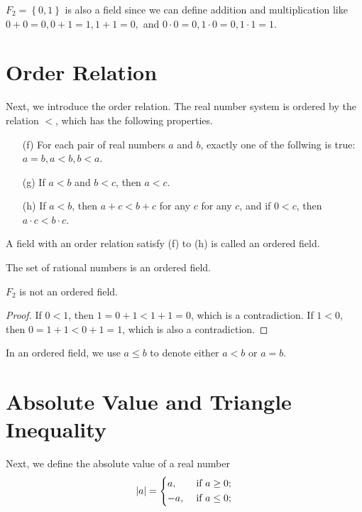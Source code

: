 \begin{eg}
  \(F_2 = \left\{ 0,1 \right\} \) is also a field since we can define addition and multiplication like \(0+0=0, 0+1=1,1+1=0,\) and \(0 \cdot 0 = 0, 1 \cdot 0 = 0, 1 \cdot 1 = 1\).   
\end{eg}

\section{Order Relation}
Next, we introduce the order relation. The real number system is ordered by the relation \(<\), which has the following properties. 
\begin{itemize}
  \item [(f)] For each pair of real numbers \(a\) and \(b\), exactly one of the follwing is true: \(a=b, a < b, b < a\).
  \item [(g)] If \(a<b\) and \(b<c\), then \(a<c\). 
  \item [(h)] If \(a<b\), then \(a+c < b+c\) for any \(c\) for any \(c\), and if \(0<c\), then \(a \cdot c < b \cdot c\).  
\end{itemize}

\begin{definition}
  A field with an order relation satisfy (f) to (h) is called an ordered field.
\end{definition}

\begin{eg}
  The set of rational numbers is an ordered field.
\end{eg}

\begin{eg}
  \(F_2\) is not an ordered field. 
\end{eg}
\begin{proof}
  If \(0<1\), then \(1=0+1 < 1+1=0\), which is a contradiction. If \(1<0\), then \(0=1+1<0+1=1\), which is also a contradiction.    
\end{proof}

\begin{notation}
  In an ordered field, we use \(a \le b\) to denote either \(a<b\) or \(a=b\).   
\end{notation}
\section{Absolute Value and Triangle Inequality}
Next, we define the absolute value of a real number 
\[
  \vert a \vert = \begin{dcases}
   a , &\text{ if } a \ge 0  ;\\
   -a , &\text{ if } a \le 0 ;
  \end{dcases} 
\]

